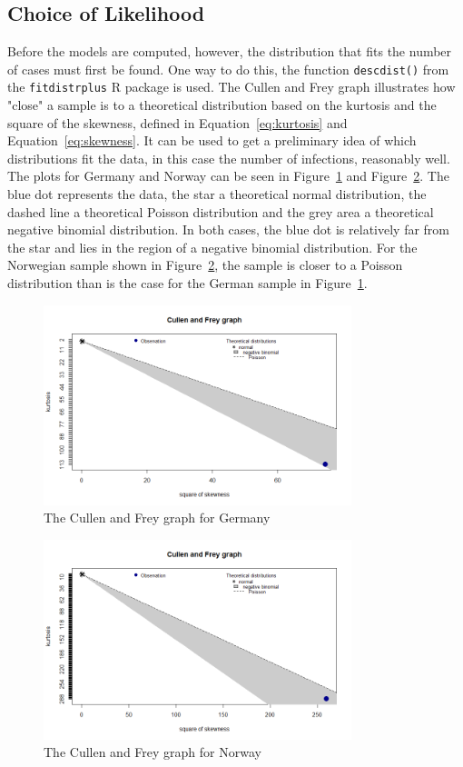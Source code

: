 \subsection{Choice of Likelihood}
Before the models are computed, however, the distribution that fits the number of cases must first be found. One way to do this, the function \texttt{descdist()} from the \texttt{fitdistrplus} R package is used. The Cullen and Frey graph illustrates how "close" a sample is to a theoretical distribution based on the kurtosis and the square of the skewness, defined in Equation~\ref{eq:kurtosis} and Equation~\ref{eq:skewness}. It can be used to get a preliminary idea of which distributions fit the data, in this case the number of infections, reasonably well. \\
The plots for Germany and Norway can be seen in Figure~\ref{cf_germany} and Figure~\ref{cf_norway}. The blue dot represents the data, the star a theoretical normal distribution, the dashed line a theoretical Poisson distribution and the grey area a theoretical negative binomial distribution. In both cases, the blue dot is relatively far from the star and lies in the region of a negative binomial distribution. For the Norwegian sample shown in Figure~\ref{cf_norway}, the sample is closer to a Poisson distribution than is the case for the German sample in Figure~\ref{cf_germany}.
\begin{figure}[H]
  \centering
  \includegraphics[width = 0.8\textwidth]{cf_germany.png}
  \caption{The Cullen and Frey graph for Germany}
  \label{cf_germany}
\end{figure}
\begin{figure}[H]
  \centering
  \includegraphics[width = 0.8\textwidth]{cf_norway.png}
  \caption{The Cullen and Frey graph for Norway}
  \label{cf_norway}
\end{figure}
